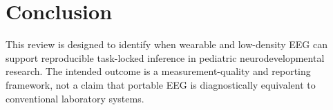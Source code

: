 \section{Conclusion}

This review is designed to identify when wearable and low-density EEG can support reproducible task-locked inference in pediatric neurodevelopmental research. The intended outcome is a measurement-quality and reporting framework, not a claim that portable EEG is diagnostically equivalent to conventional laboratory systems.
